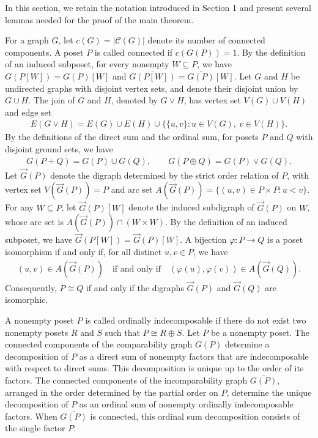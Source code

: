 \documentclass[11pt,a4paper]{article}
\begin{document}
In this section, we retain the notation introduced in Section 1
and present several lemmas needed for the proof of the main theorem.

For a graph $G$, let $c(G)=|\mathcal C(G)|$ denote its number of connected components.
A poset $P$ is called connected if $c(G(P))=1$.
By the definition of an induced subposet, for every nonempty $W\subseteq P$, 
we have $G(P[W])=G(P)[W]$ and $\overline{G(P[W])}=\overline{G(P)}[W]$.
Let $G$ and $H$ be undirected graphs with disjoint vertex sets,
and denote their disjoint union by $G\cup H$.
The join of $G$ and $H$, denoted by $G\vee H$, has vertex set $V(G)\cup V(H)$ and edge set
\begin{eqnarray*}
E(G\vee H)
=E(G)\cup E(H)\cup
\bigl\{\{u,v\}:u\in V(G),\ v\in V(H)\bigr\}.
\end{eqnarray*}
By the definitions of the direct sum and the ordinal sum,
for posets $P$ and $Q$ with disjoint ground sets, we have
\begin{eqnarray}\label{eq:graph-sums}
G(P+Q)=G(P)\cup G(Q),\qquad
G(P\oplus Q)=G(P)\vee G(Q).
\end{eqnarray}
Let $\vec G(P)$ denote the digraph determined by the strict order relation of $P$,
with vertex set $V(\vec G(P))=P$ and arc set $A(\vec G(P))=\{(u,v)\in P\times P:u<v\}$.
For any $W\subseteq P$, let $\vec G(P)[W]$ denote the induced subdigraph of $\vec G(P)$ on $W$,
whose arc set is $A(\vec G(P))\cap(W\times W)$.
By the definition of an induced subposet, we have $\vec G(P[W])=\vec G(P)[W]$.
A bijection $\varphi:P\to Q$ is a poset isomorphism if and only if, 
for all distinct $u,v\in P$, we have
\begin{eqnarray*}
(u,v)\in A(\vec G(P))
\quad\text{if and only if}\quad
(\varphi(u),\varphi(v))\in A(\vec G(Q)).
\end{eqnarray*}
Consequently, $P\cong Q$ if and only if the digraphs $\vec G(P)$ and $\vec G(Q)$ are isomorphic.

A nonempty poset $P$ is called ordinally indecomposable 
if there do not exist two nonempty posets $R$ and $S$ such that $P\cong R\oplus S$.
Let $P$ be a nonempty poset.
The connected components of the comparability graph $G(P)$ 
determine a decomposition of $P$ as a direct sum of nonempty factors
that are indecomposable with respect to direct sums.
This decomposition is unique up to the order of its factors.
The connected components of the incomparability graph $\overline{G(P)}$, 
arranged in the order determined by the partial order on $P$, 
determine the unique decomposition of $P$ as an ordinal sum of nonempty ordinally indecomposable factors.
When $\overline{G(P)}$ is connected, this ordinal sum decomposition consists of the single factor $P$.
\end{document}
